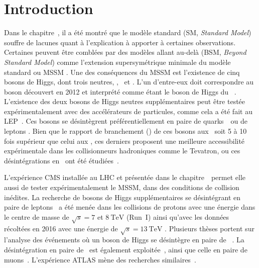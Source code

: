 \section{Introduction}\label{chapter-HTT_analysis-section-introduction}
Dans le chapitre~,
il a été montré que le modèle standard (SM, \emph{Standard Model}) souffre de lacunes quant à l'explication à apporter à certaines observations.
Certaines peuvent être comblées par des modèles allant au-delà (BSM, \emph{Beyond Standard Model}) comme l'extension supersymétrique minimale du modèle standard ou \og MSSM \fg.
Une des conséquences du MSSM est l'existence de cinq bosons de Higgs, dont trois neutres, \higgs, \Higgs\ et \HiggsA.
L'un d'entre-eux doit correspondre au boson découvert en 2012 et interprété comme étant le boson de Higgs du \SM~\cite{ATLAS_Higgs_discovery,CMS_Higgs_discovery,CMS_Higgs_discovery_2013,ATLAS-CMS-Higgs_combined_1,ATLAS-CMS-Higgs_combined_2}.
L'existence des deux bosons de Higgs neutres supplémentaires peut être testée expérimentalement avec des accélérateurs de particules,
comme cela a été fait au LEP~\cite{Schael:2006cr}.
Ces bosons se désintègrent préférentiellement en paire de quarks~\quarkb\ ou de leptons \tau.
Bien que le rapport de branchement (\BR) de ces bosons aux \quarkb\ soit 5 à 10 fois supérieur que celui aux \tau,
ces derniers proposent une meilleure accessibilité expérimentale dans les collisionneurs hadroniques comme le Tevatron,
ou ces désintégrations en \tau\ ont été étudiées~\cite{Aaltonen:2009vf,Abazov:2011jh}.
\par
L'expérience CMS installée au LHC et présentée dans le chapitre~\ permet elle aussi de tester expérimentalement le MSSM, dans des conditions de collision inédites.
La recherche de bosons de Higgs supplémentaires se désintégrant en paire de leptons \tau\ a été menée dans les collisions de protons avec une énergie dans le centre de masse de $\sqrt{s}=\num{7}$ et $\SI{8}{\TeV}$ (Run~I) \cite{Chatrchyan:2012vp,CMS-MSSM-HTT_2014,CMS-PAS-HIG-13-021,CMS-PAS-HIG-14-029} ainsi qu'avec les données récoltées en 2016 avec une énergie de $\sqrt{s}=\SI{13}{\TeV}$ \cite{CMS-PAS-HIG-17-020}.
Plusieurs thèses portent sur l'analyse des événements où un boson de Higgs se désintègre en paire de \tau~\cite{Gael_thesis,Artur_thesis}.
La désintégration en paire de \quarkb\ est également exploitée~\cite{Chatrchyan:2013qga,Khachatryan:2015tra},
ainsi que celle en paire de muons~\cite{CMS:2015ooa}.
L'expérience ATLAS mène des recherches similaires~\cite{Aad:2012cfr,ATLAS-MSSM-HTT_2018,ATLAS-MSSM-HTT_2020}.
\par

